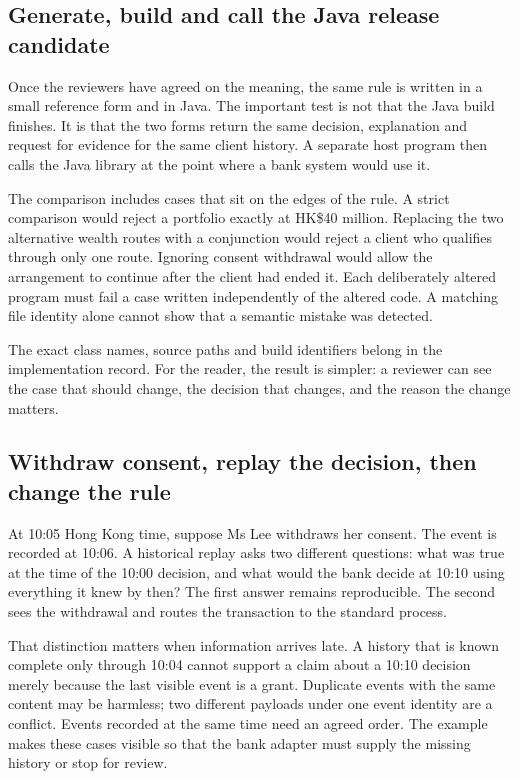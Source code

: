 \subsection{Generate, build and call the Java release candidate}
\label{merge:P-01b-complete-dry-run:05}


Once the reviewers have agreed on the meaning, the same rule is written in a
small reference form and in Java. The important test is not that the Java build
finishes. It is that the two forms return the same decision, explanation and
request for evidence for the same client history. A separate host program then
calls the Java library at the point where a bank system would use it.

The comparison includes cases that sit on the edges of the rule. A strict
comparison would reject a portfolio exactly at HK\$40 million. Replacing the two
alternative wealth routes with a conjunction would reject a client who qualifies
through only one route. Ignoring consent withdrawal would allow the arrangement
to continue after the client had ended it. Each deliberately altered program
must fail a case written independently of the altered code. A matching file
identity alone cannot show that a semantic mistake was detected.

The exact class names, source paths and build identifiers belong in the
implementation record. For the reader, the result is simpler: a reviewer can
see the case that should change, the decision that changes, and the reason the
change matters.


\subsection{Withdraw consent, replay the decision, then change the rule}
\label{merge:P-01b-complete-dry-run:06}


At 10:05 Hong Kong time, suppose Ms Lee withdraws her consent. The event is
recorded at 10:06. A historical replay asks two different questions: what was
true at the time of the 10:00 decision, and what would the bank decide at 10:10
using everything it knew by then? The first answer remains reproducible. The
second sees the withdrawal and routes the transaction to the standard process.

That distinction matters when information arrives late. A history that is known
complete only through 10:04 cannot support a claim about a 10:10 decision merely
because the last visible event is a grant. Duplicate events with the same
content may be harmless; two different payloads under one event identity are a
conflict. Events recorded at the same time need an agreed order. The example
makes these cases visible so that the bank adapter must supply the missing
history or stop for review.

